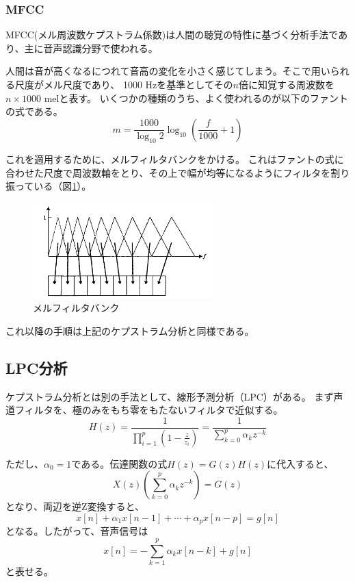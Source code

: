 \documentclass[12ptj,a4j,dvipdfmx,uplatex, titlepage]{jsarticle}
\begin{document}
\subsubsection{MFCC}
MFCC(メル周波数ケプストラム係数)は人間の聴覚の特性に基づく分析手法であり、主に音声認識分野で使われる\cite{onsei}。

人間は音が高くなるにつれて音高の変化を小さく感じてしまう。そこで用いられる尺度がメル尺度であり、
1000 \si{Hz}を基準としてその$n$倍に知覚する周波数を$n\times 1000$ \si{mel}と表す。
いくつかの種類のうち、よく使われるのが以下のファントの式である。
\begin{equation}
    m = \frac{1000}{\log_{10} 2} \log_{10} \left( \frac{f}{1000}+1 \right)
\end{equation}

これを適用するために、メルフィルタバンクをかける。
これはファントの式に合わせた尺度で周波数軸をとり、その上で幅が均等になるようにフィルタを割り振っている（図\ref{fig:mfcc}）。
\begin{figure}[htbp]
    \begin{center}
      \includegraphics[clip,width=7.0cm]{MFCC.png}
      \caption{メルフィルタバンク\cite{onsei}}
      \label{fig:mfcc}
    \end{center}
\end{figure}

これ以降の手順は上記のケプストラム分析と同様である。

\subsection{LPC分析}
ケプストラム分析とは別の手法として、線形予測分析（LPC）がある\cite{lpc}。
まず声道フィルタを、極のみをもち零をもたないフィルタで近似する。
\begin{equation}
    H(z) = \frac{1}{\prod^p _{i=1} \left( 1-\frac{z}{z_i} \right)} 
    = \frac{1}{\sum_{k=0}^p \alpha_k z^{-k}}
\end{equation}

ただし、$\alpha_0 = 1$である。伝達関数の式$H(z) = G(z)H(z)$に代入すると、
\begin{equation}
    X(z) \left( \sum_{k=0}^p \alpha_k z^{-k} \right) = G(z)
\end{equation}
となり、両辺を逆Z変換すると、
\begin{equation}
    x[n] + \alpha_1 x[n-1] + \cdots + \alpha_p x[n-p] = g[n]
\end{equation}
となる。したがって、音声信号は
\begin{equation}
    x[n] = -\sum_{k=1}^p \alpha_k x[n-k] + g[n]
\end{equation}
と表せる。
\end{document}

